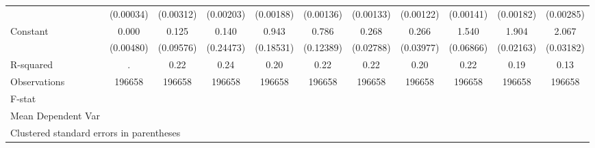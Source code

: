 {\begin{tabular}{l*{10}{c}}
                    &   (0.00034)         &   (0.00312)         &   (0.00203)         &   (0.00188)         &   (0.00136)         &   (0.00133)         &   (0.00122)         &   (0.00141)         &   (0.00182)         &   (0.00285)         \\
Constant            &       0.000         &       0.125         &       0.140         &       0.943\sym{***}&       0.786\sym{***}&       0.268\sym{***}&       0.266\sym{***}&       1.540\sym{***}&       1.904\sym{***}&       2.067\sym{***}\\
                    &   (0.00480)         &   (0.09576)         &   (0.24473)         &   (0.18531)         &   (0.12389)         &   (0.02788)         &   (0.03977)         &   (0.06866)         &   (0.02163)         &   (0.03182)         \\
\hline
R-squared           &           .         &        0.22         &        0.24         &        0.20         &        0.22         &        0.22         &        0.20         &        0.22         &        0.19         &        0.13         \\
Observations        &      196658         &      196658         &      196658         &      196658         &      196658         &      196658         &      196658         &      196658         &      196658         &      196658         \\
F-stat              &                     &                     &                     &                     &                     &                     &                     &                     &                     &                     \\
Mean Dependent Var  &                     &                     &                     &                     &                     &                     &                     &                     &                     &                     \\
\hline\hline
\multicolumn{11}{l}{\footnotesize Clustered standard errors in parentheses}\\
\end{tabular}
}
